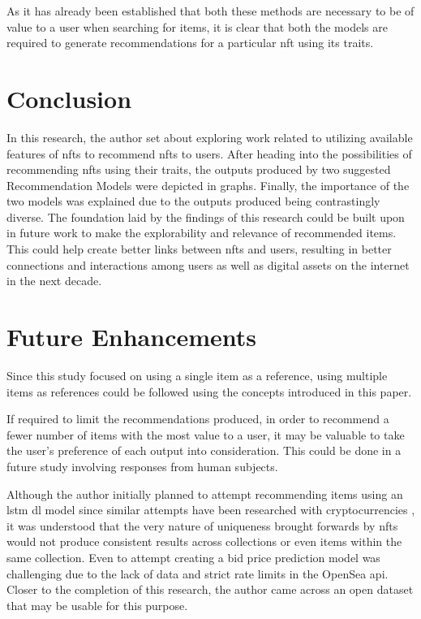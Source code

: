 \documentclass[conference]{IEEEtran}
\begin{document}
As it has already been established that both these methods are necessary to be of value to a user when searching for items, it is clear that both the models are required to generate recommendations for a particular \gls{nft} using its traits.




\section{Conclusion}
In this research, the author set about exploring work related to utilizing available features of \gls{nft}s to recommend \gls{nft}s to users. After heading into the possibilities of recommending \gls{nft}s using their traits, the outputs produced by two suggested Recommendation Models were depicted in graphs. Finally, the importance of the two models was explained due to the outputs produced being contrastingly diverse. The foundation laid by the findings of this research could be built upon in future work to make the explorability and relevance of recommended items. This could help create better links between \gls{nft}s and users, resulting in better connections and interactions among users as well as digital assets on the internet in the next decade.


\section{Future Enhancements}

Since this study focused on using a single item as a reference, using multiple items as references could be followed using the concepts introduced in this paper.

If required to limit the recommendations produced, in order to recommend a fewer number of items with the most value to a user, it may be valuable to take the user's preference of each output into consideration. This could be done in a future study involving responses from human subjects.

\bigbreak
Although the author initially planned to attempt recommending items using an \gls{lstm} \gls{dl} model since similar attempts have been researched with cryptocurrencies \autocite{ferdiansyah_lstm-method_2019}, it was understood that the very nature of uniqueness brought forwards by \gls{nft}s would not produce consistent results across collections or even items within the same collection. Even to attempt creating a bid price prediction model was challenging due to the lack of data and strict rate limits in the OpenSea \gls{api}. Closer to the completion of this research, the author came across an open dataset \autocite{zomglings_ethereum_2021} that may be usable for this purpose.
\end{document}
